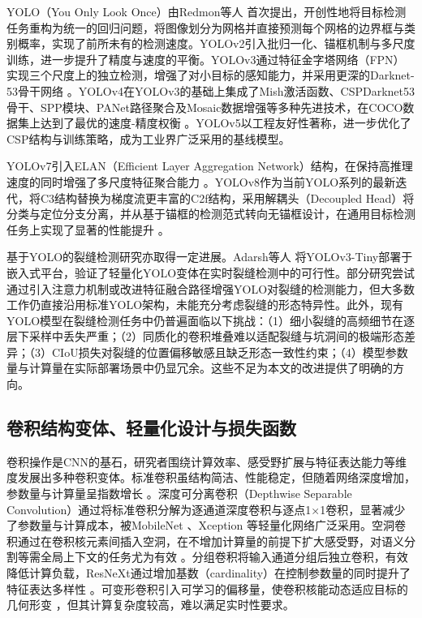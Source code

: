 \documentclass[twocolumn]{sn-jnl}
\begin{document}
YOLO（You Only Look Once）由Redmon等人 \cite{Redmon2016} 首次提出，开创性地将目标检测任务重构为统一的回归问题，将图像划分为网格并直接预测每个网格的边界框与类别概率，实现了前所未有的检测速度。YOLOv2引入批归一化、锚框机制与多尺度训练，进一步提升了精度与速度的平衡。YOLOv3通过特征金字塔网络（FPN）实现三个尺度上的独立检测，增强了对小目标的感知能力，并采用更深的Darknet-53骨干网络 \cite{Farhadi2018}。YOLOv4在YOLOv3的基础上集成了Mish激活函数、CSPDarknet53骨干、SPP模块、PANet路径聚合及Mosaic数据增强等多种先进技术，在COCO数据集上达到了最优的速度-精度权衡 \cite{Bochkovskiy2020}。YOLOv5以工程友好性著称，进一步优化了CSP结构与训练策略，成为工业界广泛采用的基线模型。

YOLOv7引入ELAN（Efficient Layer Aggregation Network）结构，在保持高推理速度的同时增强了多尺度特征聚合能力 \cite{Wang2023}。YOLOv8作为当前YOLO系列的最新迭代，将C3结构替换为梯度流更丰富的C2f结构，采用解耦头（Decoupled Head）将分类与定位分支分离，并从基于锚框的检测范式转向无锚框设计，在通用目标检测任务上实现了显著的性能提升 \cite{Jocher2023}。

基于YOLO的裂缝检测研究亦取得一定进展。Adarsh等人 \cite{Adarsh2020} 将YOLOv3-Tiny部署于嵌入式平台，验证了轻量化YOLO变体在实时裂缝检测中的可行性。部分研究尝试通过引入注意力机制或改进特征融合路径增强YOLO对裂缝的检测能力，但大多数工作仍直接沿用标准YOLO架构，未能充分考虑裂缝的形态特异性。此外，现有YOLO模型在裂缝检测任务中仍普遍面临以下挑战：（1）细小裂缝的高频细节在逐层下采样中丢失严重；（2）同质化的卷积堆叠难以适配裂缝与坑洞间的极端形态差异；（3）CIoU损失对裂缝的位置偏移敏感且缺乏形态一致性约束；（4）模型参数量与计算量在实际部署场景中仍显冗余。这些不足为本文的改进提供了明确的方向。

\subsection{卷积结构变体、轻量化设计与损失函数}
卷积操作是CNN的基石，研究者围绕计算效率、感受野扩展与特征表达能力等维度发展出多种卷积变体。标准卷积虽结构简洁、性能稳定，但随着网络深度增加，参数量与计算量呈指数增长 \cite{LeCun1998}。深度可分离卷积（Depthwise Separable Convolution）通过将标准卷积分解为逐通道深度卷积与逐点1×1卷积，显著减少了参数量与计算成本，被MobileNet \cite{Howard2017}、Xception \cite{Chollet2017} 等轻量化网络广泛采用。空洞卷积通过在卷积核元素间插入空洞，在不增加计算量的前提下扩大感受野，对语义分割等需全局上下文的任务尤为有效 \cite{Yu2015, Chen2017}。分组卷积将输入通道分组后独立卷积，有效降低计算负载，ResNeXt通过增加基数（cardinality）在控制参数量的同时提升了特征表达多样性 \cite{Xie2017}。可变形卷积引入可学习的偏移量，使卷积核能动态适应目标的几何形变 \cite{Dai2017}，但其计算复杂度较高，难以满足实时性要求。
\end{document}
